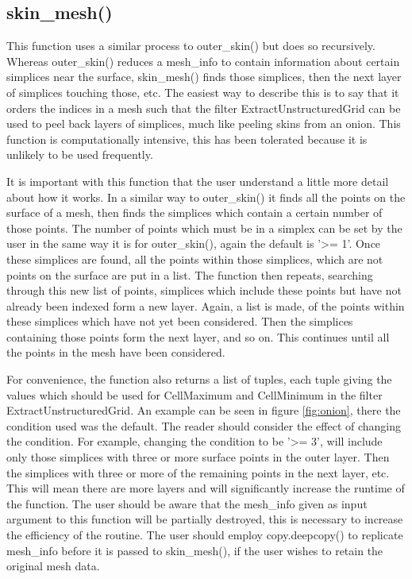 \subsection{{\ttfamily skin\_mesh()}}
This function uses a similar process to {\ttfamily outer\_skin()} but does so recursively. Whereas {\ttfamily outer\_skin()} reduces a {\ttfamily mesh\_info} to contain information about certain simplices near the surface, {\ttfamily skin\_mesh()} finds those simplices, then the next layer of simplices touching those, etc. The easiest way to describe this is to say that it orders the indices in a mesh such that the filter ExtractUnstructuredGrid can be used to peel back layers of simplices, much like peeling skins from an onion. This function is computationally intensive, this has been tolerated because it is unlikely to be used frequently. 

It is important with this function that the user understand a little more detail about how it works. In a similar way to {\ttfamily outer\_skin()} it finds all the points on the surface of a mesh, then finds the simplices which contain a certain number of those points. The number of points which must be in a simplex can be set by the user in the same way it is for {\ttfamily outer\_skin()}, again the default is {\ttfamily '>= 1'}. Once these simplices are found, all the points within those simplices, which are not points on the surface are put in a list. The function then repeats, searching through this new list of points, simplices which include these points but have not already been indexed form a new layer. Again, a list is made, of the points within these simplices which have not yet been considered. Then the simplices containing those points form the next layer, and so on. This continues until all the points in the mesh have been considered. 

For convenience, the function also returns a list of tuples, each tuple giving the values which should be used for {\ttfamily CellMaximum} and {\ttfamily CellMinimum} in the filter ExtractUnstructuredGrid. An example can be seen in figure \ref{fig:onion}, there the condition used was the default. The reader should consider the effect of changing the condition. For example, changing the condition to be {\ttfamily '>= 3'}, will include only those simplices with three or more surface points in the outer layer. Then the simplices with three or more of the remaining points in the next layer, etc. This will mean there are more layers and will significantly increase the runtime of the function. The user should be aware that the {\ttfamily mesh\_info} given as input argument to this function will be partially destroyed, this is necessary to increase the efficiency of the routine. The user should employ {\ttfamily copy.deepcopy()} to replicate {\ttfamily mesh\_info} before it is passed to {\ttfamily skin\_mesh()}, if the  user wishes to retain the original mesh data.


